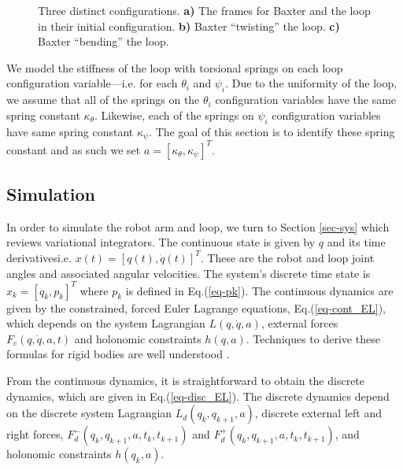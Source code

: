 \documentclass[letterpaper, 10pt, conference]{ieeeconf}
\begin{document}
\begin{figure}
\centering
\def\svgwidth{.97\textwidth}

\caption{Three distinct configurations.  \textbf{a)} The frames for Baxter and the loop in their initial configuration. \textbf{b)} Baxter ``twisting'' the loop. \textbf{c)} Baxter ``bending'' the loop.}
\label{fig-3bloops}
\end{figure}

We model the stiffness of the loop with torsional springs on each loop configuration variable---i.e. for each $\theta_i$ and $\psi_i$.  Due to the uniformity of the loop, we assume that all of the springs on the $\theta_i$ configuration variables have the same spring constant $\kappa_{\theta}$.  Likewise, each of the springs on $\psi_i$ configuration variables have same spring constant $\kappa_{\psi}$.  The goal of this section is to identify these spring constant and as such we set $a = [\kappa_{\theta}, \kappa_{\psi}]^T$.  

\subsection{Simulation}
In order to simulate the robot arm and loop, we turn to Section \ref{sec-sys} which reviews variational integrators.  The continuous state is given by $q$ and its time derivatives\textemdash i.e. $x(t) = [q(t),\dot{q}(t)]^T$.  These are the robot and loop joint angles and associated angular velocities.  The system's discrete time state is $x_k = [q_k,p_k]^T$ where $p_k$ is defined in Eq.(\ref{eq-pk}).   The continuous dynamics are given by the constrained, forced Euler Lagrange equations, Eq.(\ref{eq-cont_EL}), which depends on the system Lagrangian $L(q,\dot{q},a)$, external forces $F_c(q,\dot{q},a,t)$ and holonomic constraints $h(q,a)$. Techniques to derive these formulas for rigid bodies are well understood \cite{murray_li_sastry}.  

From the continuous dynamics, it is straightforward to obtain the discrete dynamics, which are given in Eq.(\ref{eq-disc_EL}).  The discrete dynamics depend on the discrete system Lagrangian $L_d(q_{k},q_{k+1},a)$, discrete external left and right forces, $F_d^-(q_{k},q_{k+1},a,t_k,t_{k+1})$ and $F_d^+(q_{k},q_{k+1},a,t_k,t_{k+1})$, and holonomic constraints $h(q_k,a)$.  
\end{document}
